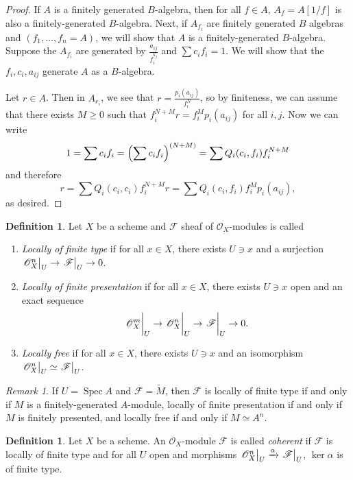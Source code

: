 \documentclass[leqno, openany]{memoir}
\theoremstyle{definition}
\newtheorem{defn}[thm]{Definition}
\theoremstyle{remark}
\newtheorem{rmk}[thm]{Remark}
\theoremstyle{plain}
\theoremstyle{definition}
\theoremstyle{remark}
\newcommand{\msc}[1]{\mathscr{#1}}
\newcommand{\wt}[1]{\widetilde{#1}}
\DeclareMathOperator{\Spec}{Spec}
\begin{document}
\begin{proof}
    If $A$ is a finitely generated $B$-algebra, then for all $f \in A$, $A_f = A[1/f]$ is also a finitely-generated $B$-algebra. Next, if $A_{f_i}$ are finitely generated $B$ algebras and $(f_1, \ldots, f_n = A)$, we will show that $A$ is a finitely-generated $B$-algebra. Suppose the $A_{f_i}$ are generated by $\frac{a_{ij}}{f_i^{k_j}}$ and $\sum c_i f_i = 1$. We will show that the $f_i, c_i, a_{ij}$ generate $A$ as a $B$-algebra.

    Let $r \in A$. Then in $A_{r_i}$, we see that $r = \frac{p_i(a_{ij})}{f_i^N}$, so by finiteness, we can assume that there exists $M \geq 0$ such that $f_i^{N+M} r = f_i^M p_i (a_{ij})$ for all $i,j$. Now we can write 
    \[ 1 = \sum c_i f_i = { \qty(\sum c_i f_i) }^{(N+M)} = \sum Q_i(c_i, f_i) f_i^{N+M} \]
    and therefore 
    \[ r = \sum Q_i(c_i, c_i) f_i^{N+M} r = \sum Q_i(c_i, f_i) f_i^M p_i(a_{ij}), \]
    as desired.
\end{proof}

\begin{defn}
    Let $X$ be a scheme and $\msc{F}$  sheaf of $\msc{O}_X$-modules is called
    \begin{enumerate}
        \item \textit{Locally of finite type} if for all $x \in X$, there exists $U \ni x$ and a surjection $\eval{\msc{O}^n_X}_U \to \eval{\msc{F}}_U \to 0$.
        \item \textit{Locally of finite presentation} if for all $x \in X$, there exists $U \ni x$ open and an exact sequence
            \[ \eval{\msc{O}^m_X}_U \to \eval{\msc{O}_X^n}_U \to \eval{\msc{F}}_U \to 0. \]
        \item \textit{Locally free} if for all $x \in X$, there exists $U \ni x$ and an isomorphism $\eval{\msc{O}_X^n}_U \simeq \eval{\msc{F}}_U$. 
    \end{enumerate}
\end{defn}

\begin{rmk}
    If $U = \Spec A$ and $\msc{F} = \wt{M}$, then $\msc{F}$ is locally of finite type if and only if $M$ is a finitely-generated $A$-module, locally of finite presentation if and only if $M$ is finitely presented, and locally free if and only if $M \simeq A^n$.
\end{rmk}

\begin{defn}
    Let $X$ be a scheme. An $\msc{O}_X$-module $\msc{F}$ is called \textit{coherent} if $\msc{F}$ is locally of finite type and for all $U$ open and morphisms $\eval{\msc{O}_X^n}_U \xrightarrow{\alpha} \eval{\msc{F}}_U$, $\ker \alpha$ is of finite type.
\end{defn}
\end{document}
